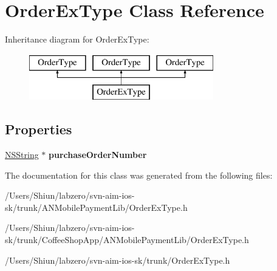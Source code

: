 \hypertarget{interface_order_ex_type}{
\section{OrderExType Class Reference}
\label{interface_order_ex_type}
}
Inheritance diagram for OrderExType:\begin{figure}[H]
\begin{center}
\leavevmode
\includegraphics[height=2.000000cm]{interface_order_ex_type}
\end{center}
\end{figure}
\subsection*{Properties}
\begin{DoxyCompactItemize}
\item 
\hypertarget{interface_order_ex_type_a326782d82de82c195c275d0a790ca8c1}{
\hyperlink{class_n_s_string}{NSString} $\ast$ {\bfseries purchaseOrderNumber}}
\label{interface_order_ex_type_a326782d82de82c195c275d0a790ca8c1}

\end{DoxyCompactItemize}


The documentation for this class was generated from the following files:\begin{DoxyCompactItemize}
\item 
/Users/Shiun/labzero/svn-\/aim-\/ios-\/sk/trunk/ANMobilePaymentLib/OrderExType.h\item 
/Users/Shiun/labzero/svn-\/aim-\/ios-\/sk/trunk/CoffeeShopApp/ANMobilePaymentLib/OrderExType.h\item 
/Users/Shiun/labzero/svn-\/aim-\/ios-\/sk/trunk/OrderExType.h\end{DoxyCompactItemize}
